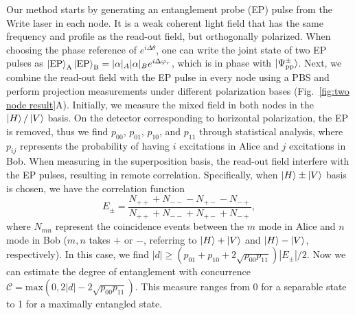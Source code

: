 \documentclass[aps,reprint,showpacs,superscriptaddress]{revtex4-2}
\begin{document}
Our method starts by generating an entanglement probe (EP) pulse from the Write laser in each node. It is a weak coherent light field that has the same frequency and profile as the read-out field, but orthogonally polarized. When choosing the phase reference of $e^{i\Delta\theta}$, one can write the joint state of two EP pulses as $\ket{\textrm{EP}}_{\textrm{A}}\ket{\textrm{EP}}_{\textrm{B}}=|\alpha|_A|\alpha|_B e^{i\Delta\varphi_r}$, which is in phase with $\ket{\Psi_{\text{pp}}^{\pm}}$. Next, we combine the read-out field with the EP pulse in every node using a PBS and perform projection measurements under different polarization bases (Fig.~\ref{fig:two node result}A). Initially, we measure the mixed field in both nodes in the $\ket{H}/\ket{V}$ basis. On the detector corresponding to horizontal polarization, the EP is removed, thus we find $p_{00}$, $p_{01}$, $p_{10}$, and $p_{11}$ through statistical analysis, where $p_{ij}$ represents the probability of having $i$ excitations in Alice and $j$ excitations in Bob. When measuring in the superposition basis, the read-out field interfere with the EP pulses, resulting in remote correlation. Specifically, when $\ket{H}\pm\ket{V}$ basis is chosen, we have the correlation function
\begin{equation}
E_{\pm}=\frac{N_{++}+N_{--}-N_{+-}-N_{-+}}{N_{++}+N_{--}+N_{+-}+N_{-+}},
\end{equation}
where $N_{mn}$ represent the coincidence events between the $m$ mode in Alice and $n$ mode in Bob ($m,n$ takes $+$ or $-$, referring to $\ket{H}+\ket{V}$ and $\ket{H}-\ket{V}$, respectively). In this case, we find $|d|\geq (p_{01}+p_{10}+2\sqrt{p_{00}p_{11}})|E_{\pm}|/2$. Now we can estimate the degree of entanglement with concurrence $\mathcal{C}=\textrm{max}(0, 2|d|-2 \sqrt{p_{00}p_{11}})$. This measure ranges from 0 for a separable state to 1 for a maximally entangled state. 
\end{document}
